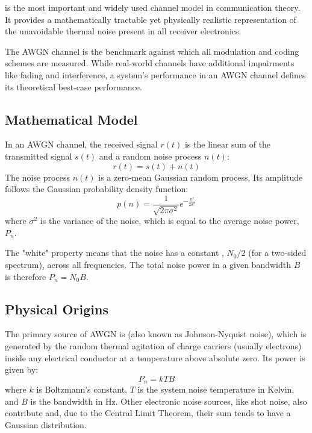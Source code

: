  is the most important and widely used channel model in communication theory. It provides a mathematically tractable yet physically realistic representation of the unavoidable thermal noise present in all receiver electronics.

\begin{keyconcept}
    The AWGN channel is the benchmark against which all modulation and coding schemes are measured. While real-world channels have additional impairments like fading and interference, a system's performance in an AWGN channel defines its theoretical best-case performance.
\end{keyconcept}


\subsection{Mathematical Model}

In an AWGN channel, the received signal $r(t)$ is the linear sum of the transmitted signal $s(t)$ and a random noise process $n(t)$:
\begin{equation}
    r(t) = s(t) + n(t)
\end{equation}
The noise process $n(t)$ is a zero-mean Gaussian random process. Its amplitude follows the Gaussian probability density function:
\begin{equation}
    p(n) = \frac{1}{\sqrt{2\pi\sigma^2}} e^{-\frac{n^2}{2\sigma^2}}
\end{equation}
where $\sigma^2$ is the variance of the noise, which is equal to the average noise power, $P_n$.

The "white" property means that the noise has a constant , $N_0/2$ (for a two-sided spectrum), across all frequencies. The total noise power in a given bandwidth $B$ is therefore $P_n = N_0 B$.


\subsection{Physical Origins}

The primary source of AWGN is  (also known as Johnson-Nyquist noise), which is generated by the random thermal agitation of charge carriers (usually electrons) inside any electrical conductor at a temperature above absolute zero. Its power is given by:
\begin{equation}
    P_n = kTB
\end{equation}
where $k$ is Boltzmann's constant, $T$ is the system noise temperature in Kelvin, and $B$ is the bandwidth in Hz. Other electronic noise sources, like shot noise, also contribute and, due to the Central Limit Theorem, their sum tends to have a Gaussian distribution.


